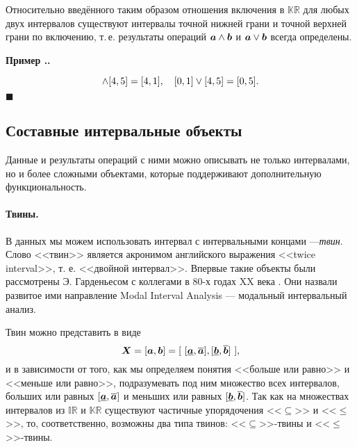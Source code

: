 \documentclass[a5paper,openany]{book}
\newcommand{\mbf}[1]{\protect\text{\boldmath$#1$}}
\newcommand{\mbb}{\mathbb}
\newcommand{\ov}{\overline}
\newcommand{\un}{\underline}
\newcounter{ExmpNum}[section]
\renewcommand{\theExmpNum}{\thesection.\arabic{ExmpNum}}
\newenvironment{example}%
{\refstepcounter{ExmpNum}%
	\par\addvspace{\medskipamount} 
	\noindent\textbf{Пример {\theExmpNum}.}
}%
{\hfill$\blacksquare$\par\medskip}
\begin{document}
Относительно введённого таким образом отношения включения в $\mbb{KR}$ для любых 
двух интервалов существуют интервалы точной нижней грани и точной верхней грани
по включению, т.\,е. результаты операций $\mbf{a}\wedge\mbf{b}$ и $\mbf{a}\vee\mbf{b}$  
всегда определены. 

\begin{example} 
	\begin{equation*} 
	[0, 1]\wedge [4, 5] = [4, 1], \quad [0, 1]\vee [4, 5] = [0, 5]. 
	\vspace{-4mm} 
	\end{equation*} 
\end{example} 

\subsection{Составные интервальные объекты} \label{CompoundObjects}	

Данные и результаты операций с ними можно описывать не только интервалами, но и более сложными объектами, которые поддерживают дополнительную функциональность.

\paragraph{Твины.}\label{twin}

В данных мы можем использовать  интервал с интервальными концами ---\emph{твин}. 
Слово <<твин>> является акронимом английского выражения <<twice interval>>, т. е. <<двойной интервал>>. Впервые такие объекты были рассмотрены Э. Гарденьесом с коллегами в 80-х годах XX века \cite{Twins1981}. Они назвали развитое ими направление  Modal Interval Analysis --- модальный интервальный анализ.  

Твин можно представить в виде
\begin{equation*}
\mbf{X} = [\mbf{a},\mbf{b}]= [ \ [\un{\mbf{a}},\ov{\mbf{a}}],[\un{\mbf{b}},\ov{\mbf{b}}] \ ],
\label{eq:deftwin}
\end{equation*}
и в зависимости от того, как мы определяем понятия <<больше или равно>> и <<меньше или равно>>, подразумевать под ним множество всех интервалов, больших или равных $[\un{\mbf{a}},\ov{\mbf{a}}]$ и меньших или равных $[\un{\mbf{b}},\ov{\mbf{b}}]$. Так как на множествах интервалов из $\mathbb{IR}$ и $\mathbb{KR}$ существуют частичные упорядочения <<$\subseteq$>> и <<$\leq$>>, то, соответственно, возможны два типа твинов: <<$\subseteq$>>-твины и <<$\leq$>>-твины.	
\end{document}

